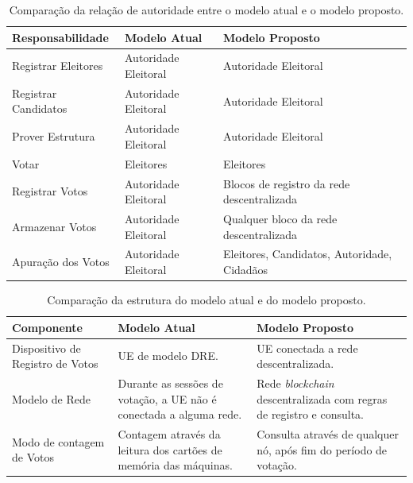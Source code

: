 \documentclass[portuguese]{textolivre}
\begin{document}
	\begin{table}[htbp]
		\centering
		\caption{Comparação da relação de autoridade entre o modelo atual e o modelo proposto.}
		\label{tab-relacao-autoridade}
		\begin{tabular}{lll}
			\toprule
			\textbf{Responsabilidade} & \textbf{Modelo Atual} & \textbf{Modelo Proposto} \\
			\midrule
			Registrar Eleitores & Autoridade Eleitoral & Autoridade Eleitoral \\
			\midrule
			Registrar Candidatos & Autoridade Eleitoral & Autoridade Eleitoral \\
			\midrule
			Prover Estrutura & Autoridade Eleitoral & Autoridade Eleitoral \\
			\midrule
			Votar & Eleitores & Eleitores \\
			\midrule
			Registrar Votos & Autoridade Eleitoral & Blocos de registro da rede descentralizada \\
			\midrule
			Armazenar Votos & Autoridade Eleitoral & Qualquer bloco da rede descentralizada\\
			\midrule
			Apuração dos Votos & Autoridade Eleitoral & Eleitores, Candidatos, Autoridade, Cidadãos \\
			\bottomrule
		\end{tabular}
	\end{table}
	
	
	
	
	
	
	\begin{table}[htbp]
		\centering
		\caption{Comparação da estrutura do modelo atual e do modelo proposto.}
		\label{tab-relacao-componentes}
		\begin{tabularx}{\textwidth}{YYY}
			\toprule
			\textbf{Componente} & \textbf{Modelo Atual}  & \textbf{Modelo Proposto} \\
			\midrule
			Dispositivo de Registro de Votos & UE de modelo DRE. & UE conectada a rede descentralizada. \\
			\midrule
			Modelo de Rede & Durante as sessões de votação, a UE não é conectada a alguma rede. & Rede \emph{blockchain} descentralizada com regras de registro e consulta. \\
			\midrule
			Modo de contagem de Votos & Contagem através da leitura dos cartões de memória das máquinas. & Consulta através de qualquer nó, após fim do período de votação. \\
			\bottomrule
		\end{tabularx}
	\end{table}
	
\end{document}

